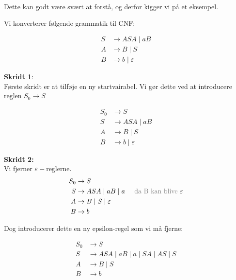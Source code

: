 Dette kan godt være svært at forstå, og derfor kigger vi på et eksempel.

\begin{example}
	Vi konverterer følgende grammatik til CNF:

	\begin{equation*}
		\begin{split}
			S &\rightarrow ASA\;|\;aB \\
			A &\rightarrow B\;|\;S \\
			B &\rightarrow b\;|\; \varepsilon
		\end{split}
	\end{equation*}

	\noindent
	\textbf{\large Skridt 1}:\\
	\noindent
	Første skridt er at tilføje en ny startvairabel. Vi gør dette ved at introducere reglen $S_{0} \rightarrow S$

	\begin{equation*}
		\begin{split}
			S_{0} &\rightarrow S\\
			S &\rightarrow ASA \;|\; aB\\
			A &\rightarrow B \;|\; S\\
			B &\rightarrow b \;|\; \varepsilon
		\end{split}
	\end{equation*}

	\noindent
	\textbf{\large Skridt 2:}\\
	\noindent
	Vi fjerner $\varepsilon-$reglerne.
	\begin{equation*}
		\begin{split}
			S_{0} &\rightarrow S\\
			S &\rightarrow ASA \;|\; aB \;|\; a\;\;\;\;\; \text{\color{gray}da B kan blive }\varepsilon\\
			A &\rightarrow B \;|\; S \; | \; \varepsilon\\
			B &\rightarrow b
		\end{split}
	\end{equation*}

	\noindent
	Dog introducerer dette en ny epsilon-regel som vi må fjerne:


	\begin{equation*}
		\begin{split}
			S_{0} &\rightarrow S\\
			S &\rightarrow ASA \;|\; aB \;|\; a \;| \;SA \;| \;AS \;| \;S\\
			A &\rightarrow B \;|\; S \\
			B &\rightarrow b
		\end{split}
	\end{equation*}


\end{example}
